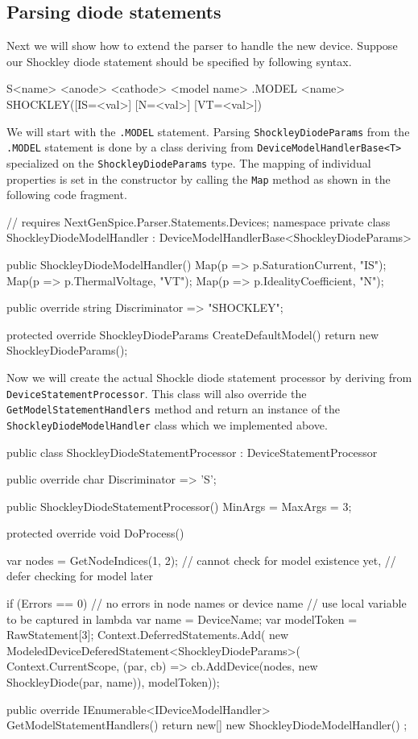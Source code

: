 \subsection{Parsing diode statements}
\label{chap:userdocs:diode-example:parser}

Next we will show how to extend the parser to handle the new device. Suppose our Shockley diode statement should be specified by following syntax.

\begin{code}
S<name> <anode> <cathode> <model name>
.MODEL <name> SHOCKLEY([IS=<val>] [N=<val>] [VT=<val>])
\end{code}

We will start with the \texttt{.MODEL} statement. Parsing \texttt{ShockleyDiode\+Params} from the \texttt{.MODEL} statement is done by a class deriving from \texttt{Device\+ModelHandler\+Base<T>} specialized on the \texttt{ShockleyDiodeParams} type. The mapping of individual properties is set in the constructor by calling the \texttt{Map} method as shown in the following code fragment.


\begin{csharpcode}
// requires NextGenSpice.Parser.Statements.Devices; namespace
private class ShockleyDiodeModelHandler
	: DeviceModelHandlerBase<ShockleyDiodeParams>
{
	public ShockleyDiodeModelHandler()
	{
		Map(p => p.SaturationCurrent, "IS");
		Map(p => p.ThermalVoltage, "VT");
		Map(p => p.IdealityCoefficient, "N");
	}
	
	public override string Discriminator => "SHOCKLEY";
	
	protected override ShockleyDiodeParams CreateDefaultModel()
	{
		return new ShockleyDiodeParams();
	}
}
\end{csharpcode}

Now we will create the actual Shockle diode statement processor by deriving from \texttt{DeviceStatementProcessor}. This class will also override the \texttt{GetModel\+StatementHandlers} method and return an instance of the \texttt{ShockleyDiodeModel\+Handler} class which we implemented above.

\begin{csharpcode}
public class ShockleyDiodeStatementProcessor : DeviceStatementProcessor
{
	public override char Discriminator => 'S';
	
	public ShockleyDiodeStatementProcessor()
	{
		MinArgs = MaxArgs = 3;
	}
	
	protected override void DoProcess()
	{
		var nodes = GetNodeIndices(1, 2); 
		// cannot check for model existence yet,
		// defer checking for model later		
		
		if (Errors == 0) // no errors in node names or device name
		{
			// use local variable to be captured in lambda
			var name = DeviceName;
			var modelToken = RawStatement[3];
			Context.DeferredStatements.Add(
				new ModeledDeviceDeferedStatement<ShockleyDiodeParams>(
					Context.CurrentScope,
					(par, cb) =>
						 cb.AddDevice(nodes, new ShockleyDiode(par, name)),
					modelToken));
		}
	}

	public override IEnumerable<IDeviceModelHandler>
		GetModelStatementHandlers()
	{
		return new[] { new ShockleyDiodeModelHandler() };
	}
}
\end{csharpcode}


